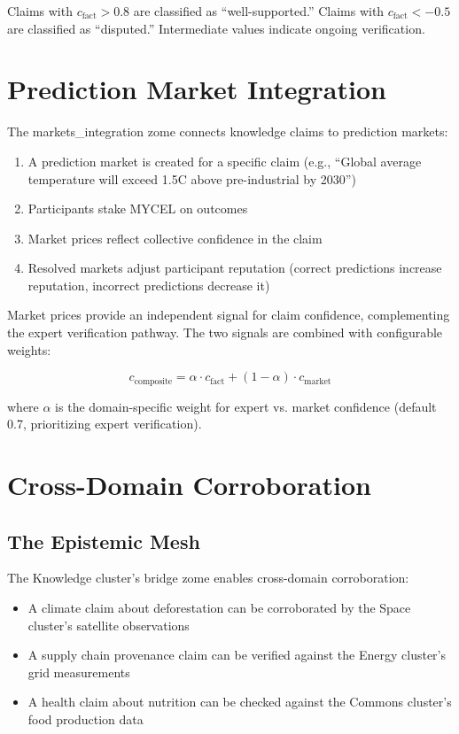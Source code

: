 \documentclass[11pt,twocolumn]{article}
\begin{document}
Claims with $c_{\text{fact}} > 0.8$ are classified as ``well-supported.''
Claims with $c_{\text{fact}} < -0.5$ are classified as ``disputed.''
Intermediate values indicate ongoing verification.

\section{Prediction Market Integration}

The markets\_integration zome connects knowledge claims to prediction
markets:

\begin{enumerate}[nosep]
  \item A prediction market is created for a specific claim (e.g.,
    ``Global average temperature will exceed 1.5C above pre-industrial
    by 2030'')
  \item Participants stake MYCEL on outcomes
  \item Market prices reflect collective confidence in the claim
  \item Resolved markets adjust participant reputation (correct predictions
    increase reputation, incorrect predictions decrease it)
\end{enumerate}

Market prices provide an independent signal for claim confidence,
complementing the expert verification pathway. The two signals are
combined with configurable weights:

\begin{equation}
  c_{\text{composite}} = \alpha \cdot c_{\text{fact}} +
    (1 - \alpha) \cdot c_{\text{market}}
\end{equation}

where $\alpha$ is the domain-specific weight for expert vs. market
confidence (default 0.7, prioritizing expert verification).

\section{Cross-Domain Corroboration}

\subsection{The Epistemic Mesh}

The Knowledge cluster's bridge zome enables cross-domain corroboration:

\begin{itemize}[nosep]
  \item A climate claim about deforestation can be corroborated by the
    Space cluster's satellite observations
  \item A supply chain provenance claim can be verified against the
    Energy cluster's grid measurements
  \item A health claim about nutrition can be checked against the
    Commons cluster's food production data
\end{itemize}
\end{document}
